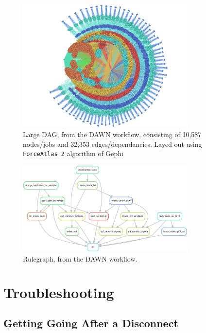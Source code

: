 \begin{figure}[H]
\centering
\includegraphics[width=0.8\textwidth]{handout/DAWN_DAG.png}
\caption{Large DAG, from the DAWN workflow, consisting of 10,587 nodes/jobs and 32,353 edges/dependancies. Layed out using \texttt{ForceAtlas 2} algorithm of Gephi}
\label{fig:dawn_dag}
\end{figure}

\begin{figure}[H]
\centering
\includegraphics[width=0.8\textwidth]{handout/DAWN_rulegraph.pdf}
\caption{Rulegraph, from the DAWN workflow.}
\label{fig:dawn_rulegraph}
\end{figure}


%
%
%


\newpage
\section{Troubleshooting}
\label{sec:snake_trouble}

\subsection{Getting Going After a Disconnect}

